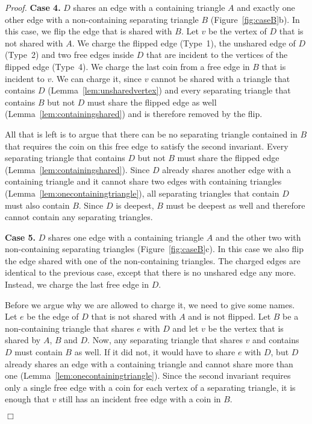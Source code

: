 \pdfoutput=1 \documentclass[12pt]{elsarticle}
\newenvironment{proof}{\emph{Proof.}}{\hfill $\Box$ \medskip\\}
\begin{document}
\begin{proof}
 \smallskip
  \textbf{Case 4.} $D$ shares an edge with a containing triangle $A$ and exactly one other edge with a non-containing separating triangle $B$ (Figure~\ref{fig:caseB}b). In this case, we flip the edge that is shared with $B$. Let $v$ be the vertex of $D$ that is not shared with $A$. We charge the flipped edge (Type~1), the unshared edge of $D$ (Type~2) and two free edges inside $D$ that are incident to the vertices of the flipped edge (Type~4). We charge the last coin from a free edge in $B$ that is incident to $v$. We can charge it, since $v$ cannot be shared with a triangle that contains $D$ (Lemma~\ref{lem:unsharedvertex}) and every separating triangle that contains $B$ but not $D$ must share the flipped edge as well (Lemma~\ref{lem:containingshared}) and is therefore removed by the flip.

  All that is left is to argue that there can be no separating triangle contained in $B$ that requires the coin on this free edge to satisfy the second invariant. Every separating triangle that contains $D$ but not $B$ must share the flipped edge (Lemma~\ref{lem:containingshared}). Since $D$ already shares another edge with a containing triangle and it cannot share two edges with containing triangles (Lemma~\ref{lem:onecontainingtriangle}), all separating triangles that contain $D$ must also contain $B$. Since $D$ is deepest, $B$ must be deepest as well and therefore cannot contain any separating triangles.

 \smallskip
  \textbf{Case 5.} $D$ shares one edge with a containing triangle $A$ and the other two with non-containing separating triangles (Figure~\ref{fig:caseB}c). In this case we also flip the edge shared with one of the non-containing triangles. The charged edges are identical to the previous case, except that there is no unshared edge any more. Instead, we charge the last free edge in $D$.

  Before we argue why we are allowed to charge it, we need to give some names. Let $e$ be the edge of $D$ that is not shared with $A$ and is not flipped. Let $B$ be a non-containing triangle that shares $e$ with $D$ and let $v$ be the vertex that is shared by $A$, $B$ and $D$. Now, any separating triangle that shares $v$ and contains $D$ must contain $B$ as well. If it did not, it would have to share $e$ with $D$, but $D$ already shares an edge with a containing triangle and cannot share more than one (Lemma~\ref{lem:onecontainingtriangle}). Since the second invariant requires only a single free edge with a coin for each vertex of a separating triangle, it is enough that $v$ still has an incident free edge with a coin in $B$.
 

\end{proof}
\end{document}
